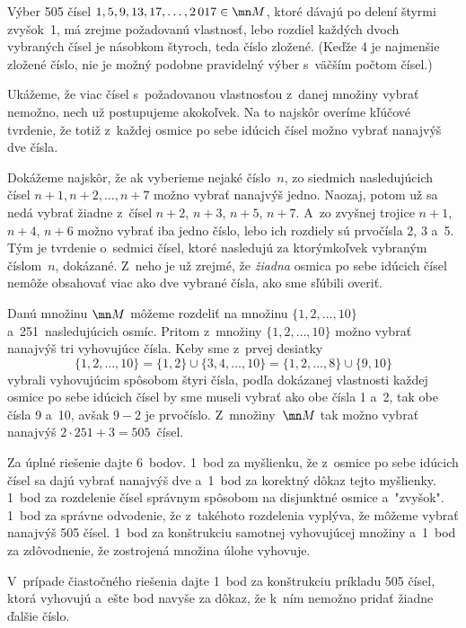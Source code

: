 {%
Výber 505 čísel $1, 5, 9, 13, 17,\dots, 2\,017\in\mn M$,
ktoré dávajú po delení štyrmi zvyšok~1, má zrejme požadovanú vlastnosť,
lebo rozdiel každých dvoch vybraných čísel je násobkom štyroch, teda číslo zložené.
(Keďže 4 je najmenšie zložené číslo, nie je možný podobne pravidelný výber
s~väčším počtom čísel.)

Ukážeme, že viac čísel s~požadovanou vlastnosťou z~danej množiny
vybrať nemožno, nech už postupujeme akokoľvek. Na to najskôr overíme kľúčové tvrdenie,
že totiž z~každej osmice po sebe idúcich čísel možno vybrať nanajvýš
dve čísla.

Dokážeme najskôr, že ak vyberieme nejaké číslo~$n$, zo siedmich nasledujúcich čísel
$n+1,n+2,\dots,n+7$ možno vybrať nanajvýš jedno. Naozaj, potom už sa nedá
vybrať žiadne z~čísel $n+2$, $n+3$, $n+5$, $n+7$.
A~zo zvyšnej trojice $n+1$, $n+4$, $n+6$ možno
vybrať iba jedno číslo, lebo ich rozdiely sú prvočísla 2, 3 a~5.
Tým je tvrdenie o~sedmici čísel, ktoré nasledujú za ktorýmkoľvek vybraným číslom~$n$,
dokázané. Z~neho je už zrejmé, že {\it žiadna\/} osmica po sebe idúcich čísel nemôže
obsahovať viac ako dve vybrané čísla, ako sme sľúbili overiť.

Danú množinu $\mn M$ môžeme rozdeliť na množinu $\{1, 2, \dots, 10\}$
a~251~nasledujúcich osmíc. Pritom z~množiny $\{1, 2, \dots, 10\}$
možno vybrať nanajvýš tri vyhovujúce čísla.
Keby sme z~prvej desiatky
$$
\{1, 2,\dots, 10\}=\{1, 2\}\cup\{3, 4,\dots, 10\}=\{1, 2,\dots, 8\}\cup\{9, 10\}
$$
vybrali vyhovujúcim spôsobom štyri čísla, podľa dokázanej vlastnosti
každej osmice po sebe idúcich čísel by sme museli vybrať ako obe čísla 1 a~2,
tak obe čísla 9 a~10, avšak $9-2$ je prvočíslo.
Z~množiny~$\mn M$ tak možno vybrať nanajvýš $2\cdot 251+3=505$~čísel.

\nobreak\medskip\petit\noindent
Za úplné riešenie dajte 6~bodov.
1~bod za myšlienku, že z~osmice po sebe idúcich čísel sa dajú vybrať
nanajvýš dve a~1~bod za korektný dôkaz tejto myšlienky.
1~bod za rozdelenie čísel správnym spôsobom na disjunktné osmice a~"zvyšok".
1~bod za správne odvodenie, že z~takéhoto rozdelenia vyplýva, že môžeme
vybrať nanajvýš 505 čísel.
1~bod za konštrukciu samotnej vyhovujúcej množiny
a~1~bod za zdôvodnenie, že zostrojená množina úlohe vyhovuje.

V~prípade čiastočného riešenia dajte 1~bod za konštrukciu príkladu 505 čísel,
ktorá vyhovujú a~ešte bod navyše za dôkaz, že
k~ním nemožno pridať žiadne ďalšie číslo.
\endpetit
\bigbreak
}

